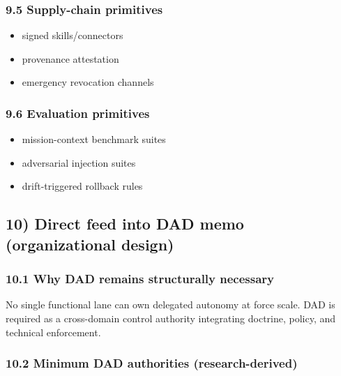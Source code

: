 \documentclass[11pt]{article}
\begin{document}
\hypertarget{supply-chain-primitives}{%
\subsubsection{9.5 Supply-chain
primitives}\label{supply-chain-primitives}}

\begin{itemize}
\tightlist
\item
  signed skills/connectors
\item
  provenance attestation
\item
  emergency revocation channels
\end{itemize}

\hypertarget{evaluation-primitives}{%
\subsubsection{9.6 Evaluation primitives}\label{evaluation-primitives}}

\begin{itemize}
\tightlist
\item
  mission-context benchmark suites
\item
  adversarial injection suites
\item
  drift-triggered rollback rules
\end{itemize}

\hypertarget{direct-feed-into-dad-memo-organizational-design}{%
\subsection{10) Direct feed into DAD memo (organizational
design)}\label{direct-feed-into-dad-memo-organizational-design}}

\hypertarget{why-dad-remains-structurally-necessary}{%
\subsubsection{10.1 Why DAD remains structurally
necessary}\label{why-dad-remains-structurally-necessary}}

No single functional lane can own delegated autonomy at force scale. DAD
is required as a cross-domain control authority integrating doctrine,
policy, and technical enforcement.

\hypertarget{minimum-dad-authorities-research-derived}{%
\subsubsection{10.2 Minimum DAD authorities
(research-derived)}\label{minimum-dad-authorities-research-derived}}
\end{document}
